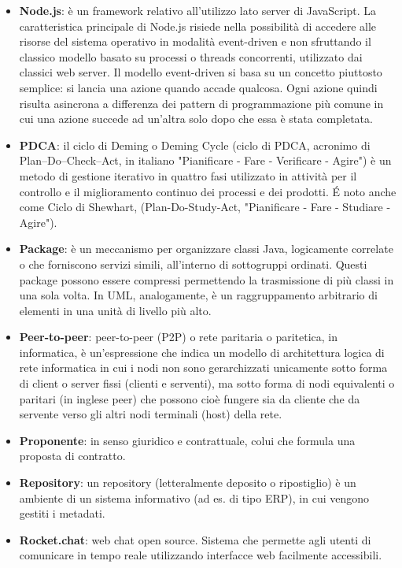 \begin{itemize}
\item[] \textbf{Node.js}: è un framework relativo all'utilizzo lato server di JavaScript. La caratteristica principale di Node.js risiede nella possibilità di accedere alle risorse del sistema operativo in modalità event-driven e non sfruttando il classico modello basato su processi o threads concorrenti, utilizzato dai classici web server. Il modello event-driven si basa su un concetto piuttosto semplice: si lancia una azione quando accade qualcosa. Ogni azione quindi risulta asincrona a differenza dei pattern di programmazione più comune in cui una azione succede ad un'altra solo dopo che essa è stata completata.
\end{itemize}
\newpage

\begin{itemize}
\item[] \textbf{PDCA}: il ciclo di Deming o Deming Cycle (ciclo di PDCA, acronimo di Plan–Do–Check–Act, in italiano "Pianificare - Fare - Verificare - Agire") è un metodo di gestione iterativo in quattro fasi utilizzato in attività per il controllo e il miglioramento continuo dei processi e dei prodotti. \'E noto anche come Ciclo di Shewhart, (Plan-Do-Study-Act, "Pianificare - Fare - Studiare - Agire").
\item[] \textbf{Package}: è un meccanismo per organizzare classi Java, logicamente correlate o che forniscono servizi simili, all'interno di sottogruppi ordinati. Questi package possono essere compressi permettendo la trasmissione di più classi in una sola volta. In UML, analogamente, è un raggruppamento arbitrario di elementi in una unità di livello più alto.
\item[] \textbf{Peer-to-peer}: peer-to-peer (P2P) o rete paritaria o paritetica, in informatica, è un'espressione che indica un modello di architettura logica di rete informatica in cui i nodi non sono gerarchizzati unicamente sotto forma di client o server fissi (clienti e serventi), ma sotto forma di nodi equivalenti o paritari (in inglese peer) che possono cioè fungere sia da cliente che da servente verso gli altri nodi terminali (host) della rete.
\item[] \textbf{Proponente}: in senso giuridico e contrattuale, colui che formula una proposta di contratto.
\end{itemize}
\newpage

\begin{itemize}
\item[] \textbf{Repository}: un repository (letteralmente deposito o ripostiglio) è un ambiente di un sistema informativo (ad es. di tipo ERP), in cui vengono gestiti i metadati.
\item[] \textbf{Rocket.chat}: web chat open source. Sistema che permette agli utenti di comunicare in tempo reale utilizzando interfacce web facilmente accessibili.
\end{itemize}
\newpage


